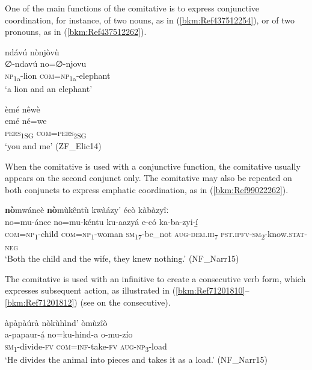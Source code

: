 One of the main functions of the comitative is to express conjunctive coordination, for instance, of two nouns, as in (\ref{bkm:Ref437512254}), or of two pronouns, as in (\ref{bkm:Ref437512262}).

\ea
\label{bkm:Ref437512254}
ndávú nònjòvù\\
\gll ∅-ndavú   no=∅-njovu\\
\textsc{np}\textsubscript{1a}-lion   \textsc{com}=\textsc{np}\textsubscript{1a}-elephant\\
\glt ‘a lion and an elephant’
\z

\ea
\label{bkm:Ref437512262}
èmé nêwè\\
\gll emé    né=we\\
\textsc{pers}\textsubscript{1SG}  \textsc{com}=\textsc{pers}\textsubscript{2SG}\\
\glt ‘you and me’ (ZF\_Elic14)
\z

When the comitative is used with a conjunctive function, the comitative usually appears on the second conjunct only. The comitative may also be repeated on both conjuncts to express emphatic coordination, as in (\ref{bkm:Ref99022262}).

\ea
\label{bkm:Ref99022262}
\textbf{nò}mwáncè \textbf{nò}mùkêntù kwàázy’ écò kàbàzyîː\\
\gll no=mu-ánce    no=mu-kéntu ku-aazyá  e-có    ka-ba-zyi-í̲\\
\textsc{com}=\textsc{np}\textsubscript{1}-child  \textsc{com}=\textsc{np}\textsubscript{1}-woman
\textsc{sm}\textsubscript{17}-be\_not  \textsc{aug}-\textsc{dem}.\textsc{iii}\textsubscript{7}  \textsc{pst}.\textsc{ipfv}-\textsc{sm}\textsubscript{2}-know.\textsc{stat}-\textsc{neg}\\
\glt ‘Both the child and the wife, they knew nothing.’ (NF\_Narr15)
\z

The comitative is used with an infinitive to create a consecutive verb form, which expresses subsequent action, as illustrated in (\ref{bkm:Ref71201810}--\ref{bkm:Ref71201812}) (see  on the consecutive).

\ea
\label{bkm:Ref71201810}
àpàpàúrà nòkùhìnd’ òmùzîò\\
\gll a-papaur-á̲    no=ku-hind-a  o-mu-zío\\
\textsc{sm}\textsubscript{1}-divide-\textsc{fv}  \textsc{com}=\textsc{inf}-take-\textsc{fv}  \textsc{aug}-\textsc{np}\textsubscript{3}-load\\
\glt ‘He divides the animal into pieces and takes it as a load.’ (NF\_Narr15)
\z

